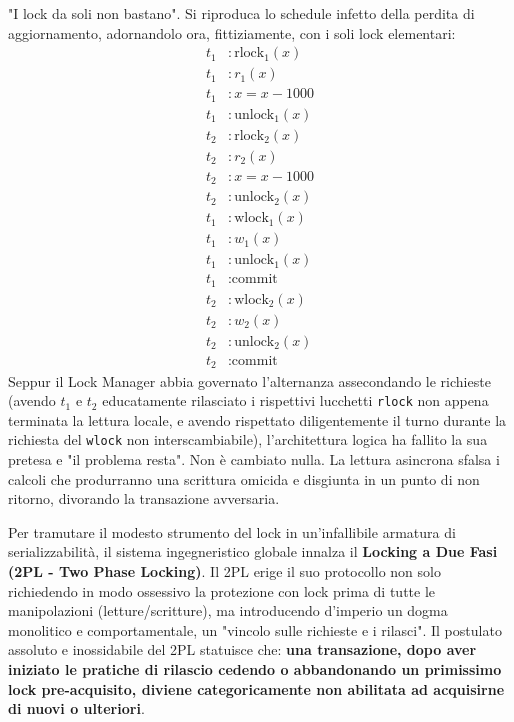 "I lock da soli non bastano".
Si riproduca lo schedule infetto della perdita di aggiornamento, adornandolo ora, fittiziamente, con i soli lock elementari:
\begin{align*}
    t_1&: \text{rlock}_1(x) \\
    t_1&: r_1(x) \\
    t_1&: x = x - 1000 \\
    t_1&: \text{unlock}_1(x) \\
    t_2&: \text{rlock}_2(x) \\
    t_2&: r_2(x) \\
    t_2&: x = x - 1000 \\
    t_2&: \text{unlock}_2(x) \\
    t_1&: \text{wlock}_1(x) \\
    t_1&: w_1(x) \\
    t_1&: \text{unlock}_1(x) \\
    t_1&: \text{commit} \\
    t_2&: \text{wlock}_2(x) \\
    t_2&: w_2(x) \\
    t_2&: \text{unlock}_2(x) \\
    t_2&: \text{commit}
\end{align*}
Seppur il Lock Manager abbia governato l'alternanza assecondando le richieste (avendo $t_1$ e $t_2$ educatamente rilasciato i rispettivi lucchetti \texttt{rlock} non appena terminata la lettura locale, e avendo rispettato diligentemente il turno durante la richiesta del \texttt{wlock} non interscambiabile), l'architettura logica ha fallito la sua pretesa e "il problema resta". Non è cambiato nulla. La lettura asincrona sfalsa i calcoli che produrranno una scrittura omicida e disgiunta in un punto di non ritorno, divorando la transazione avversaria.

Per tramutare il modesto strumento del lock in un'infallibile armatura di serializzabilità, il sistema ingegneristico globale innalza il \textbf{Locking a Due Fasi (2PL - Two Phase Locking)}.
Il 2PL erige il suo protocollo non solo richiedendo in modo ossessivo la protezione con lock prima di tutte le manipolazioni (letture/scritture), ma introducendo d'imperio un dogma monolitico e comportamentale, un "vincolo sulle richieste e i rilasci".
Il postulato assoluto e inossidabile del 2PL statuisce che: \textbf{una transazione, dopo aver iniziato le pratiche di rilascio cedendo o abbandonando un primissimo lock pre-acquisito, diviene categoricamente non abilitata ad acquisirne di nuovi o ulteriori}.

